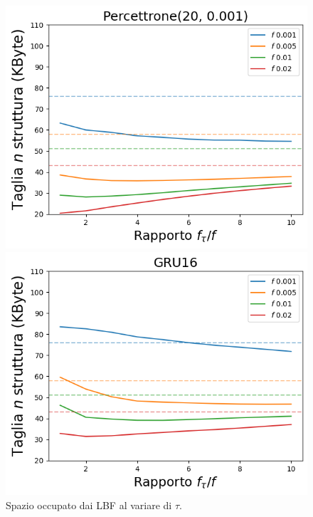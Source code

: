 \documentclass{beamer}
\begin{document}
\begin{frame}
\begin{figure}[htbp]
        \begin{minipage}[t]{\textwidth}
        \centering
        \caption{Spazio occupato dai LBF al variare di $\tau$.}
        \end{minipage}%
    

        \begin{minipage}{0.25\textwidth}
        \centering
        \includegraphics[width=\textwidth]{immagini/7/SLBF/Percettrone(20, 0.001)_Taglia.png}
        \end{minipage}%
        \hfill
        \begin{minipage}{0.25\textwidth}
        \centering
        \includegraphics[width=\textwidth]{immagini/7/SLBF/GRU16_Taglia.png}

\end{minipage}
\end{figure}
\end{frame}
\end{document}
